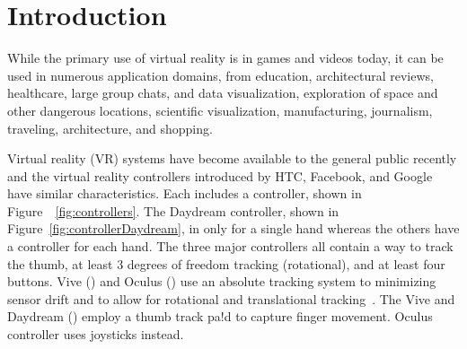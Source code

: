 \section{Introduction}

While the primary use of virtual reality is in games and videos today, it can be used in numerous application domains, from education, architectural reviews, healthcare, large group chats, and data visualization, exploration of space and other dangerous locations, scientific visualization, manufacturing, journalism, traveling, architecture, and shopping.  

Virtual reality (VR) systems have become available to the general public recently and the virtual reality controllers introduced by HTC, Facebook, and Google have similar characteristics. 
Each includes a controller, shown in Figure~~\ref{fig:controllers}.
The Daydream controller, shown in Figure~\ref{fig:controllerDaydream}, in only for a single hand whereas the others have a controller for each hand.  The three major controllers all contain a way to track the thumb, at least 3 degrees of freedom tracking  (rotational), and at least four buttons.
Vive () and Oculus () use an absolute tracking system to minimizing sensor drift and to allow for rotational and translational tracking~\cite{hilfert2016low}.  The Vive and Daydream () employ a thumb track pa!d to capture finger movement.  Oculus controller uses joysticks instead. 


